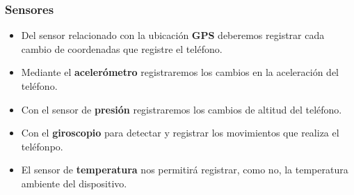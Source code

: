 \documentclass[12pt,a4paper,oneside]{book} %
\begin{document}
\subsubsection{Sensores}
\begin{itemize}
  \item Del sensor relacionado con la ubicación \textbf{GPS} deberemos registrar cada cambio de coordenadas que registre el teléfono. 
  \item Mediante el \textbf{acelerómetro} registraremos los cambios en la aceleración del teléfono. 
  \item Con el sensor de \textbf{presión} registraremos los cambios de altitud del teléfono. 
  \item Con el \textbf{giroscopio} para detectar y registrar  los movimientos que realiza el teléfonpo. 
  \item El sensor de \textbf{temperatura} nos permitirá registrar, como no, la temperatura ambiente del dispositivo. 
\end{itemize}
\newpage
\end{document}
